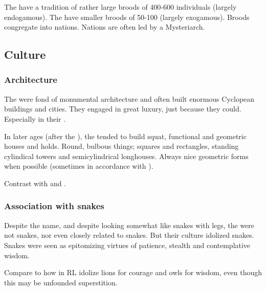 The  have a tradition of rather large broods of 400-600 individuals (largely endogamous). The  have smaller broods of 50-100 (largely exogamous). Broods congregate into nations. Nations are often led by a Mysteriarch. 










\subsection{Culture}





\subsubsection{Architecture}
The \ophidians{} were fond of monumental architecture and often built enormous Cyclopean buildings and cities.
They engaged in great luxury, just because they could. 
Especially in their . 

In later ages (after the \firstbanewar), the \ophidians tended to build squat, functional and geometric houses and holds. 
Round, bulbous things; squares and rectangles, standing cylindical towers and semicylindrical longhouses. 
Always nice geometric forms when possible (sometimes in accordance with ). 

Contrast with  and . 





\subsubsection{Association with snakes}
Despite the name, and despite looking somewhat like snakes with legs, the \ophidians{} were not snakes, nor even closely related to snakes. 
But their culture idolized snakes. 
Snakes were seen as epitomizing virtues of patience, stealth and contemplative wisdom. 

Compare to how \humans{} in RL idolize lions for courage and owls for wisdom, even though this may be unfounded superstition. 

